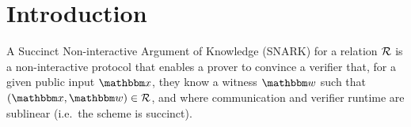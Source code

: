 \documentclass[11pt,letterpaper,usenames,dvipsnames]{article}
\title{\plaintitle}
\date{\today}
\begin{document}
\maketitle

\begin{abstract}
\end{abstract}

\setcounter{tocdepth}{3}

\tableofcontents


\section{Introduction}


A Succinct Non-interactive Argument of Knowledge (SNARK) for a relation $\mathcal{R}$ is a non-interactive protocol that enables a prover to convince a verifier that, for a given public input $\inp$, they know a witness $\wit$ such that $(\inp,\wit)\in \Relation$, and where communication and verifier runtime are sublinear (i.e.\ the scheme is succinct).
\end{document}
